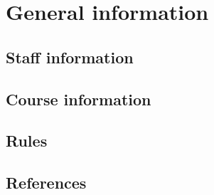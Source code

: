 \section{General information}

\subsection{Staff information}

\subsection{Course information}

\subsection{Rules}


\subsection{References}

